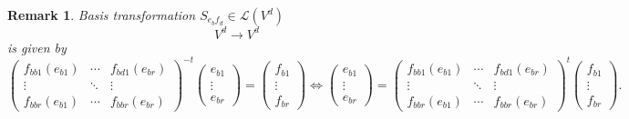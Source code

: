 \documentclass[aps,preprint]{revtex4}
\newtheorem{remark}[theorem]{Remark}
\begin{document}
\begin{remark}
Basis transformation 
$S_{e_{b}f_{d}}\in \mathcal{L}\left( V^{d}\right) $ 
\begin{equation}
V^{d}\rightarrow V^{d}
\end{equation}%
is given by 
\begin{equation}
\left( 
\begin{array}{ccc}
f_{bb1}\left( e_{b1}\right) & \cdots & f_{bd1}\left( e_{br}\right) \\ 
\vdots & \ddots & \vdots \\ 
f_{bbr}\left( e_{b1}\right) & \cdots & f_{bbr}\left( e_{br}\right)%
\end{array}%
\right) ^{-t}\left( 
\begin{array}{c}
e_{b1} \\ 
\vdots \\ 
e_{br}%
\end{array}%
\right) =\left( 
\begin{array}{c}
f_{b1} \\ 
\vdots \\ 
f_{br}%
\end{array}%
\right) \Leftrightarrow \left( 
\begin{array}{c}
e_{b1} \\ 
\vdots \\ 
e_{br}%
\end{array}%
\right) =\left( 
\begin{array}{ccc}
f_{bb1}\left( e_{b1}\right) & \cdots & f_{bd1}\left( e_{br}\right) \\ 
\vdots & \ddots & \vdots \\ 
f_{bbr}\left( e_{b1}\right) & \cdots & f_{bbr}\left( e_{br}\right)%
\end{array}%
\right) ^{t}\left( 
\begin{array}{c}
f_{b1} \\ 
\vdots \\ 
f_{br}%
\end{array}%
\right) .
\end{equation}
\end{remark}
\end{document}
